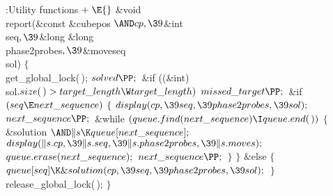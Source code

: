 \Y\B\4:Utility functions\X${}\mathrel+\E{}$\6
\&{void} \\{report}(\&{const} \&{cubepos} ${}{\AND}\\{cp},\39{}$\&{int} %
\\{seq}${},\39{}$\&{long} \&{long} \\{phase2probes}${},\39{}$\&{moveseq} %
\\{sol})\1\1\2\2\6
${}\{{}$\1\6
\\{get\_global\_lock}(\,);\6
${}\\{solved}\PP;{}$\6
\&{if} ((\&{int}) \\{sol}${}.\\{size}(\,)>\\{target\_length}\W\\{target%
\_length}){}$\1\5
${}\\{missed\_target}\PP;{}$\2\6
\&{if} ${}(\\{seq}\E\\{next\_sequence}){}$\5
${}\{{}$\1\6
${}\\{display}(\\{cp},\39\\{seq},\39\\{phase2probes},\39\\{sol});{}$\6
${}\\{next\_sequence}\PP;{}$\6
\&{while} ${}(\\{queue}.\\{find}(\\{next\_sequence})\I\\{queue}.\\{end}(\,)){}$%
\5
${}\{{}$\1\6
\&{solution} ${}{\AND}\|s\K\\{queue}[\\{next\_sequence}];{}$\7
${}\\{display}(\|s.\\{cp},\39\|s.\\{seq},\39\|s.\\{phase2probes},\39\|s.%
\\{moves});{}$\6
${}\\{queue}.\\{erase}(\\{next\_sequence});{}$\6
${}\\{next\_sequence}\PP;{}$\6
\4${}\}{}$\2\6
\4${}\}{}$\2\6
\&{else}\5
${}\{{}$\1\6
${}\\{queue}[\\{seq}]\K\&{solution}(\\{cp},\39\\{seq},\39\\{phase2probes},\39%
\\{sol});{}$\6
\4${}\}{}$\2\6
\\{release\_global\_lock}(\,);\6
\4${}\}{}$\2\par
\fi

